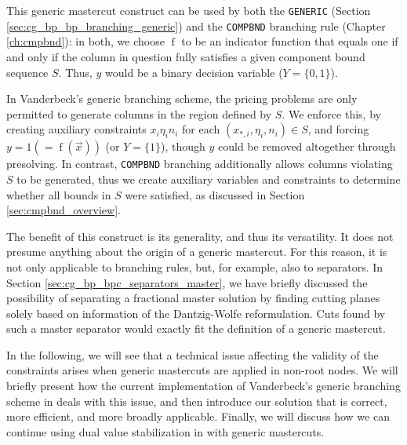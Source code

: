 This generic mastercut construct can be used by both the \texttt{GENERIC} (Section \ref{sec:cg_bp_bp_branching_generic}) and the \texttt{COMPBND} branching rule (Chapter \ref{ch:cmpbnd}): in both, we choose $\operatorname{f}$ to be an indicator function that equals one if and only if the column in question fully satisfies a given component bound sequence $S$. Thus, $y$ would be a binary decision variable ($Y = \{0, 1\}$).

In Vanderbeck's generic branching scheme, the pricing problems are only permitted to generate columns in the region defined by $S$. We enforce this, by creating auxiliary constraints $x_i \eta_i n_i$ for each $\left( x_{*,i}, \eta_i, n_i \right) \in S$, and forcing $y = 1 (= \operatorname{f}(\vec{x}))$ (or $Y = \{1\}$), though $y$ could be removed altogether through presolving. In contrast, \texttt{COMPBND} branching additionally allows columns violating $S$ to be generated, thus we create auxiliary variables and constraints to determine whether all bounds in $S$ were satisfied, as discussed in Section \ref{sec:cmpbnd_overview}.

The benefit of this construct is its generality, and thus its versatility. It does not presume anything about the origin of a generic mastercut. For this reason, it is not only applicable to branching rules, but, for example, also to separators. In Section \ref{sec:cg_bp_bpc_separators_master}, we have briefly discussed the possibility of separating a fractional master solution by finding cutting planes solely based on information of the Dantzig-Wolfe reformulation. Cuts found by such a master separator would exactly fit the definition of a generic mastercut.

In the following, we will see that a technical issue affecting the validity of the constraints arises when generic mastercuts are applied in non-root nodes. We will briefly present how the current implementation of Vanderbeck's generic branching scheme in \GCG{} deals with this issue, and then introduce our solution that is correct, more efficient, and more broadly applicable. Finally, we will discuss how we can continue using dual value stabilization in \GCG{} with generic mastercuts.


